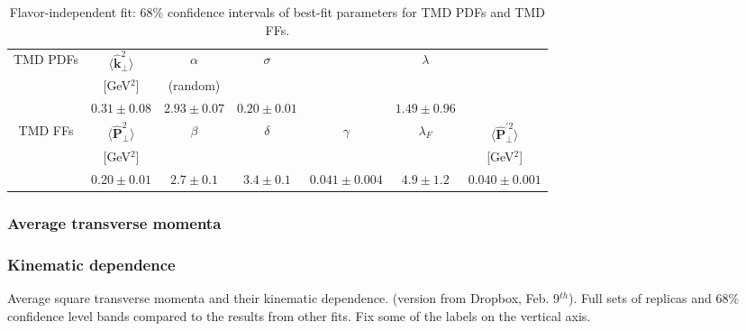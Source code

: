 \documentclass[aps,preprintnumbers,showpacs,nofootinbib,superscriptaddress,floatfix]{revtex4}
\newcommand{\T}{\perp}
\begin{document}
\begin{table}[h!]
\small
  \centering
  \begin{tabular}{|c||c|c|c|c|c|c|}
\hline
\hline
TMD PDFs&  $\big \langle \hat{\bm{k}}_{\T}^2 \big \rangle$ 
& $\alpha$ & $\sigma$ & & $\lambda$ &  
 \\ 
        & {[GeV$^2$]}                               &
      (random) &      &  & & \\
\hline
  & $0.31 \pm 0.08$ & $2.93 \pm 0.07 $ & $0.20 \pm
0.01$  &  & $1.49 \pm 0.96$ &    \\
\hline
\hline
TMD FFs&  $\big \langle \hat{\bm{P}}_{\perp}^2 \big \rangle$ &
$\beta$ & $\delta$ & $\gamma$ & $\lambda_F$ & $\big \langle
\hat{\bm{P}}_{\perp}^{\prime 2} \big \rangle$
 \\ 
        & {[GeV$^2$]} &            &         & & &{[GeV$^2$]}    \\
\hline
   &  $0.20 \pm 0.01$ & $2.7 \pm 0.1 $ & $3.4
\pm 0.1$ & $0.041 \pm 0.004$ & $4.9 \pm 1.2$ & $0.040 \pm 0.001$  \\
\hline
\hline
\end{tabular}
\caption{Flavor-independent fit: $68\%$ confidence intervals of best-fit parameters for TMD PDFs and TMD FFs.}
\label{t:fl_ind_par_TMD}
\end{table}



\subsubsection{Average transverse momenta}
\label{sss:kT2_PT2}


\subsubsection{Kinematic dependence}
\label{sss:kindep}

Average square transverse momenta and their kinematic dependence.  (version from Dropbox, Feb. 9$^{th}$).
Full sets of replicas and $68\%$ confidence level bands compared to the results from other fits.
Fix some of the labels on the vertical axis.
\end{document}
